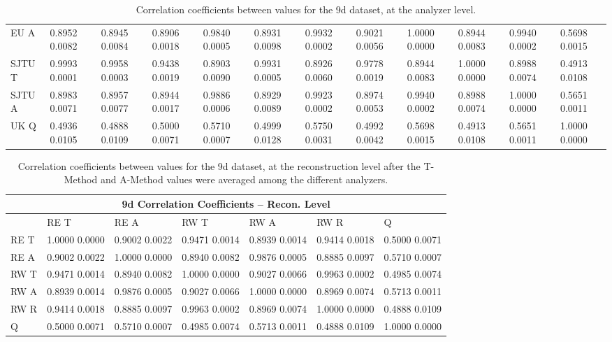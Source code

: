 \begin{landscape}
\begin{table}
\begin{tabularx}{1\linewidth}{@{\extracolsep{\fill}}lXXXXXXXXXXX}
	EU A   & 0.8952 0.0082 & 0.8945 0.0084 & 0.8906 0.0018 & 0.9840 0.0005 & 0.8931 0.0098 & 0.9932 0.0002 & 0.9021 0.0056 & 1.0000 0.0000 & 0.8944 0.0083 & 0.9940 0.0002 & 0.5698 0.0015  \\
	SJTU T & 0.9993 0.0001 & 0.9958 0.0003 & 0.9438 0.0019 & 0.8903 0.0090 & 0.9931 0.0005 & 0.8926 0.0060 & 0.9778 0.0019 & 0.8944 0.0083 & 1.0000 0.0000 & 0.8988 0.0074 & 0.4913 0.0108  \\
	SJTU A & 0.8983 0.0071 & 0.8957 0.0077 & 0.8944 0.0017 & 0.9886 0.0006 & 0.8929 0.0089 & 0.9923 0.0002 & 0.8974 0.0053 & 0.9940 0.0002 & 0.8988 0.0074 & 1.0000 0.0000 & 0.5651 0.0011  \\
	UK Q   & 0.4936 0.0105 & 0.4888 0.0109 & 0.5000 0.0071 & 0.5710 0.0007 & 0.4999 0.0128 & 0.5750 0.0031 & 0.4992 0.0042 & 0.5698 0.0015 & 0.4913 0.0108 & 0.5651 0.0011 & 1.0000 0.0000  \\
  \bottomrule
\end{tabularx}
\caption[]{Correlation coefficients between \R values for the 9d dataset, at the analyzer level.}
\label{tab:Corrs_9d_analyzer}
\end{table}
\end{landscape}


\begin{table}
\setlength\tabcolsep{15pt}
\small
\centering
\renewcommand{\arraystretch}{1.4}
\begin{tabularx}{0.8\linewidth}{@{\extracolsep{\fill}}lXXXXXX}
  \toprule
  	\multicolumn{7}{c}{{\normalsize 9d Correlation Coefficients -- Recon. Level}} \\
  \midrule
  	       & RE T & RE A & RW T & RW A & RW R & \quad Q \\
  \midrule
	RE T   & 1.0000 0.0000 & 0.9002 0.0022 & 0.9471 0.0014 & 0.8939 0.0014 & 0.9414 0.0018 & 0.5000 0.0071  \\
	RE A   & 0.9002 0.0022 & 1.0000 0.0000 & 0.8940 0.0082 & 0.9876 0.0005 & 0.8885 0.0097 & 0.5710 0.0007  \\
	RW T   & 0.9471 0.0014 & 0.8940 0.0082 & 1.0000 0.0000 & 0.9027 0.0066 & 0.9963 0.0002 & 0.4985 0.0074  \\
	RW A   & 0.8939 0.0014 & 0.9876 0.0005 & 0.9027 0.0066 & 1.0000 0.0000 & 0.8969 0.0074 & 0.5713 0.0011  \\
	RW R   & 0.9414 0.0018 & 0.8885 0.0097 & 0.9963 0.0002 & 0.8969 0.0074 & 1.0000 0.0000 & 0.4888 0.0109  \\
	Q      & 0.5000 0.0071 & 0.5710 0.0007 & 0.4985 0.0074 & 0.5713 0.0011 & 0.4888 0.0109 & 1.0000 0.0000  \\
  \bottomrule
\end{tabularx}
\caption[]{Correlation coefficients between \R values for the 9d dataset, at the reconstruction level after the \RW T-Method and A-Method \R values were averaged among the different analyzers.}
\label{tab:Corrs_9d_recon}
\end{table}


